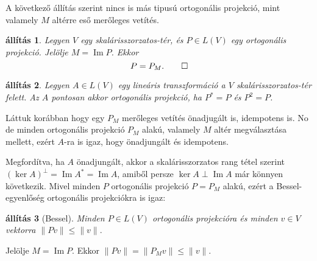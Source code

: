 \documentclass[9pt, a4paper, showtrims]{memoir}
\makeatletter
\renewenvironment{proof}[1][\proofname]
    {\par\pushQED{\qed}%
    \normalfont \topsep6\p@\@plus6\p@\relax
    \trivlist
    \item[\hskip\labelsep
        \itshape
    #1\@addpunct{:}]\ignorespaces}
    {\popQED\endtrivlist\@endpefalse}
\theoremstyle{plain}
\newtheorem{proposition}{állítás}[chapter]
\theoremstyle{remark}
\theoremstyle{definition}
\DeclareMathOperator{\im}{Im}
\makeatother
\begin{document}
A következő állítás szerint nincs is más tipusú ortogonális projekció,
mint valamely $M$ altérre eső merőleges vetítés.
\begin{proposition}
    Legyen $V$ egy skalárisszorzatos-tér,
    és $P\in L\left( V \right)$ egy ortogonális projekció.
    Jelölje $M=\im P$.
    Ekkor
    \[
        P=P_M.
        \qedhere
    \]
\end{proposition}
\begin{proposition}
    Legyen $A\in L\left( V \right)$ egy lineáris transzformáció a $V$ skalárisszorzatos-tér felett.
    Az $A$ pontosan akkor ortogonális projekció, ha $P^\ast=P$ és $P^2=P$.
\end{proposition}
\begin{proof}
    Láttuk korábban hogy egy $P_M$ merőleges vetítés önadjugált is, idempotens is.
    No de minden ortogonális projekció $P_M$ alakú,
    valamely $M$ altér megválasztása mellett, ezért $A$-ra is igaz, hogy önadjungált és idempotens.

    Megfordítva, ha $A$ önadjungált, akkor a skalárisszorzatos rang tétel szerint $(\ker A)^\perp=\im A^\ast=\im A$,
    amiből persze $\ker A\perp\im A$ már könnyen következik.
\end{proof}
Mivel minden $P$ ortogonális projekció $P=P_M$ alakú,
ezért a Bessel-egyenlőség ortogonális projekciókra is igaz:
\begin{proposition}[Bessel]
    Minden  $P\in L\left( V \right)$ ortogonális projekcióra és minden $v\in V$ vektorra
    \(
        \|Pv\|\leq\|v\|.
    \)
\end{proposition}
\begin{proof}
    Jelölje $M=\im P$.
    Ekkor 
    \(
        \|Pv\|
        =
        \|P_Mv\|
        \leq
        \|v\|.
    \)
\end{proof}
\end{document}
